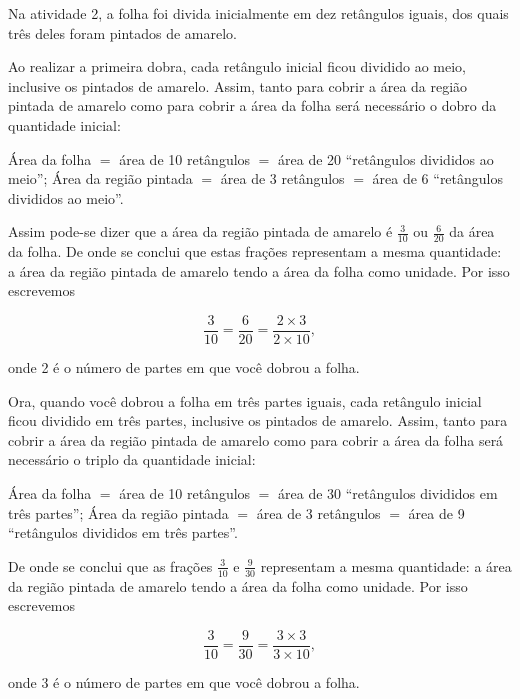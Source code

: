 \begin{refletindo*}

Na atividade 2, a folha foi divida inicialmente em dez retângulos iguais, dos quais três deles foram pintados de amarelo.

Ao realizar a primeira dobra, cada retângulo inicial ficou dividido ao meio, inclusive os pintados de amarelo. Assim, tanto para cobrir a área da região pintada de amarelo como para cobrir a área da folha será necessário o dobro da quantidade inicial:

Área da folha $=$ área de 10 retângulos $=$ área de 20 ``retângulos divididos ao meio'';\mbox{} \newline 
Área da região pintada $=$ área de 3 retângulos $=$ área de 6 ``retângulos divididos ao meio''.

Assim pode-se dizer que a área da região pintada de amarelo é $\frac{3}{10}$ ou  $\frac{6}{20}$ da área da folha. De onde se conclui que estas frações representam a mesma quantidade: a área da região pintada de amarelo tendo a área da folha como unidade. Por isso escrevemos

$$\dfrac{3}{10} = \dfrac{6}{20} = \dfrac{2 \times 3}{2 \times 10},$$

onde 2 é o número de partes em que você dobrou a folha.

Ora, quando você dobrou a folha em três partes iguais, cada retângulo inicial ficou dividido em três partes, inclusive os pintados de amarelo. Assim, tanto para cobrir a área da região pintada de amarelo como para cobrir a área da folha será necessário o triplo da quantidade inicial:

Área da folha $=$ área de 10 retângulos $=$ área de 30 ``retângulos divididos em três partes'';\mbox{} \newline 
Área da região pintada $=$ área de 3 retângulos $=$ área de 9 ``retângulos divididos em três partes''.

De onde se conclui que as frações $\frac{3}{10}$ e $\frac{9}{30}$ representam a mesma quantidade: a área da região pintada de amarelo tendo a área da folha como unidade. Por isso escrevemos

$$\dfrac{3}{10} = \dfrac{9}{30} = \dfrac{3 \times 3}{3 \times 10},$$

onde 3 é o número de partes em que você dobrou a folha. 


\end{refletindo*}

